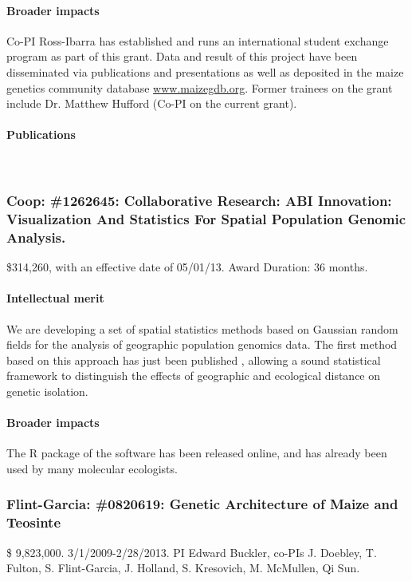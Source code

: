 \paragraph*{Broader impacts} Co-PI Ross-Ibarra has established and runs an international student exchange program as part of this grant. Data and result of this project have been disseminated via publications and presentations as well as deposited in the maize genetics community database \url{www.maizegdb.org}. Former trainees on the grant include Dr. Matthew Hufford (Co-PI on the current grant).
\paragraph*{Publications} \citet{Shi2010a, Chia2012a, Fang2012a, Hufford2012, Hufford2012b, Hufford2013, Melters2013a, Kanizay2013, Pyhajarvi2013}

\subsubsection*{Coop: \#1262645: Collaborative Research: ABI Innovation: Visualization And Statistics For Spatial Population Genomic Analysis. }
\$314,260, with an effective date of 05/01/13. Award Duration: 36 months.
\paragraph*{Intellectual merit}  We are developing a set of spatial statistics methods based on Gaussian random fields for the analysis of geographic population genomics data. The first method based on this approach has just been published \citep{bradburd2013}, allowing a sound statistical framework to distinguish the effects of geographic and ecological distance on genetic isolation. \\
\paragraph*{Broader impacts} The R package of the software has been released online, and has already been used by many molecular ecologists. 

\subsubsection*{Flint-Garcia: \#0820619: Genetic Architecture of Maize and Teosinte}
\$ 9,823,000. 3/1/2009-2/28/2013. PI Edward Buckler, co-PIs J. Doebley, T. Fulton, S. Flint-Garcia, J. Holland, S. Kresovich, M. McMullen, Qi Sun. 
